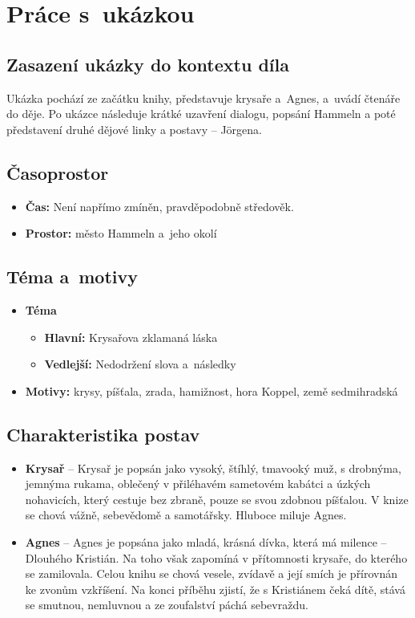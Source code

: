 \section{Práce s~ukázkou}

\subsection{Zasazení ukázky do kontextu díla}
Ukázka pochází ze začátku knihy, představuje krysaře a~Agnes, a~uvádí čtenáře do děje. Po ukázce následuje krátké uzavření dialogu, popsání Hammeln a poté představení druhé dějové linky a postavy -- Jörgena.

\subsection{Časoprostor}
\begin{itemize}
    \item \textbf{Čas:} Není napřímo zmíněn, pravděpodobně středověk.
	\item \textbf{Prostor:} město Hammeln a~jeho okolí
\end{itemize}

\subsection{Téma a~motivy}
\begin{itemize}
    \item \textbf{Téma}
    \begin{itemize}
        \item \textbf{Hlavní:} Krysařova zklamaná láska
        \item \textbf{Vedlejší:} Nedodržení slova a~následky
    \end{itemize}
    \item \textbf{Motivy:} krysy, píšťala, zrada, hamižnost, hora Koppel, země sedmihradská
\end{itemize}

\subsection{Charakteristika postav}
\begin{itemize}
	\item \textbf{Krysař} -- Krysař je popsán jako vysoký, štíhlý, tmavooký muž, s drobnýma, jemnýma rukama, oblečený v přiléhavém sametovém kabátci a úzkých nohavicích, který cestuje bez zbraně, pouze se svou zdobnou píšťalou. V knize se chová vážně, sebevědomě a samotářsky. Hluboce miluje Agnes.
	\item \textbf{Agnes} -- Agnes je popsána jako mladá, krásná dívka, která má milence -- Dlouhého Kristián. Na toho však zapomíná v přítomnosti krysaře, do kterého se zamilovala. Celou knihu se chová vesele, zvídavě a její smích je přírovnán ke zvonům vzkříšení. Na konci příběhu zjistí, že s Kristiánem čeká dítě, stává se smutnou, nemluvnou a ze zoufalství páchá sebevraždu.
\end{itemize}

